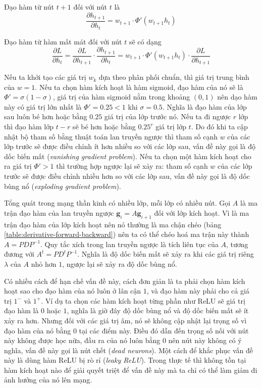 Đạo hàm từ nút $t+1$ đối với nút $t$ là
\[
    \dfrac{\partial h_{t+1}}{\partial h_t}=w_{t+1}\cdot\Phi'(w_{t+1}h_t)
\]

Đạo hàm từ hàm mất mát đối với nút $t$ sẽ có dạng
\[
    \dfrac{\partial L}{\partial h_t}=\dfrac{\partial L}{\partial h_{t+1}}\cdot\dfrac{\partial h_{t+1}}{\partial h_t}=w_{t+1}\cdot\Phi'(w_{t+1}h_t)\cdot\dfrac{\partial L}{\partial h_{t+1}}
\]

Nếu ta khởi tạo các giá trị $w_k$ dựa theo phân phối chuẩn, thì giá trị trung bình của $w=1$. Nếu ta chọn hàm kích hoạt là hàm sigmoid, đạo hàm của nó sẽ là $\Phi'=\sigma(1-\sigma)$, giá trị của hàm sigmoid nằm trong khoảng $(0,1)$ nên dạo hàm này có giá trị lớn nhất là $\Phi'=0.25<1$ khi $\sigma=0.5$. Nghĩa là đạo hàm của lớp sau luôn bé hơn hoặc bằng $0.25$ giá trị của lớp trước nó. Nếu ta đi ngược $r$ lớp thì đạo hàm lớp $t-r$ sẽ bé hơn hoặc bằng $0.25^r$ giá trị lớp $t$. Do đó khi ta cập nhật bộ tham số bằng thuật toán lan truyền ngược thì tham số cạnh $w$ của các lớp trước sẽ được điều chỉnh ít hơn nhiều so với các lớp sau, vấn đề này gọi là độ dốc biến mất (\textit{vanishing gradient problem}). Nếu ta chọn một hàm kích hoạt cho ra giá trị $\Phi'>1$ thì trường hợp ngược lại sẽ xảy ra: tham số cạnh $w$ của các lớp trước sẽ được điều chỉnh nhiều hơn so với các lớp sau, vấn đề này gọi là độ dốc bùng nổ (\textit{exploding gradient problem}).

Tổng quát trong mạng thần kinh có nhiều lớp, mỗi lớp có nhiều nút. Gọi $A$ là ma trận đạo hàm của lan truyền ngược $\mathbf g_i = A\mathbf g_{i+1}$ đối với lớp kích hoạt. Vì là ma trận đạo hàm của lớp kích hoạt nên nó thường là ma chận chéo (bảng \ref{table:derivative-forward-backward}) nên ta có thể chéo hoá ma trận này thành $A=PDP^{-1}$. Quy tắc xích trong lan truyền ngược là tích liên tục của $A$, tương đương với $A^t=PD^tP^{-1}$. Nghĩa là độ dốc biến mất sẽ xảy ra khi các giá trị riêng $\lambda$ của $A$ nhỏ hơn $1$, ngược lại sẽ xảy ra độ dốc bùng nổ. \cite{Aggarwal2023-zk}

Có nhiều cách để hạn chế vấn đề này, cách đơn giản là ta phải chọn hàm kích hoạt sao cho đạo hàm của nó luôn ở lân cận $1$, và đạo hàm này phải cho cả giá trị $1^-$ và $1^+$. Ví dụ ta chọn các hàm kích hoạt từng phần như ReLU sẽ giá trị đạo hàm là $0$ hoặc $1$, nghĩa là giờ đây độ dốc bùng nổ và độ dốc biến mất sẽ ít xảy ra hơn. Nhưng đối với các giá trị âm, nó sẽ không cập nhật lại trọng số vì đạo hàm của nó bằng $0$ tại các điểm này. Điều đó dẫn đến trọng số nối với nút này không được học nữa, đầu ra của nó luôn bằng $0$ nên nút này không có ý nghĩa, vấn đề này gọi là nút chết (\textit{dead neurons}). Một cách để khắc phục vấn đề này là dùng hàm ReLU bị rò rỉ (\textit{leaky ReLU}). Trong thực tế thì không tồn tại hàm kích hoạt nào để giải quyết triệt để vấn đề này mà ta chỉ có thể làm giảm đi ảnh hưởng của nó lên mạng.
